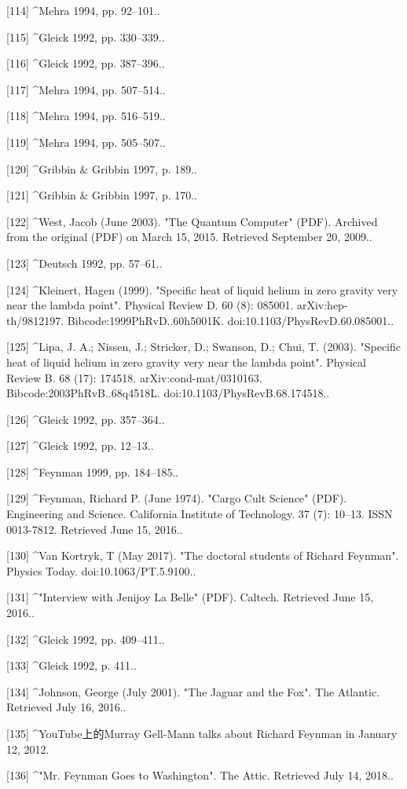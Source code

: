 [114]
^Mehra 1994, pp. 92–101..

[115]
^Gleick 1992, pp. 330–339..

[116]
^Gleick 1992, pp. 387–396..

[117]
^Mehra 1994, pp. 507–514..

[118]
^Mehra 1994, pp. 516–519..

[119]
^Mehra 1994, pp. 505–507..

[120]
^Gribbin & Gribbin 1997, p. 189..

[121]
^Gribbin & Gribbin 1997, p. 170..

[122]
^West, Jacob (June 2003). "The Quantum Computer" (PDF). Archived from the original (PDF) on March 15, 2015. Retrieved September 20, 2009..

[123]
^Deutsch 1992, pp. 57–61..

[124]
^Kleinert, Hagen (1999). "Specific heat of liquid helium in zero gravity very near the lambda point". Physical Review D. 60 (8): 085001. arXiv:hep-th/9812197. Bibcode:1999PhRvD..60h5001K. doi:10.1103/PhysRevD.60.085001..

[125]
^Lipa, J. A.; Nissen, J.; Stricker, D.; Swanson, D.; Chui, T. (2003). "Specific heat of liquid helium in zero gravity very near the lambda point". Physical Review B. 68 (17): 174518. arXiv:cond-mat/0310163. Bibcode:2003PhRvB..68q4518L. doi:10.1103/PhysRevB.68.174518..

[126]
^Gleick 1992, pp. 357–364..

[127]
^Gleick 1992, pp. 12–13..

[128]
^Feynman 1999, pp. 184–185..

[129]
^Feynman, Richard P. (June 1974). "Cargo Cult Science" (PDF). Engineering and Science. California Institute of Technology. 37 (7): 10–13. ISSN 0013-7812. Retrieved June 15, 2016..

[130]
^Van Kortryk, T (May 2017). "The doctoral students of Richard Feynman". Physics Today. doi:10.1063/PT.5.9100..

[131]
^"Interview with Jenijoy La Belle" (PDF). Caltech. Retrieved June 15, 2016..

[132]
^Gleick 1992, pp. 409–411..

[133]
^Gleick 1992, p. 411..

[134]
^Johnson, George (July 2001). "The Jaguar and the Fox". The Atlantic. Retrieved July 16, 2016..

[135]
^YouTube上的Murray Gell-Mann talks about Richard Feynman in January 12, 2012.

[136]
^"Mr. Feynman Goes to Washington". The Attic. Retrieved July 14, 2018..

